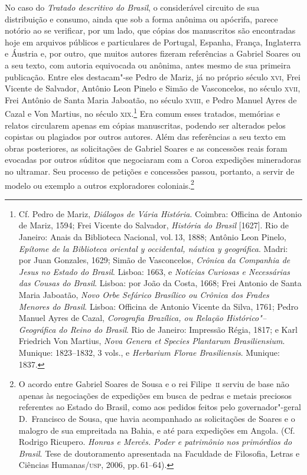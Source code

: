 \documentclass[12pt]{extarticle}
\begin{document}
No caso do \textit{Tratado descritivo do Brasil}, o considerável
circuito de sua distribuição e consumo, ainda que sob a forma anônima
ou apócrifa, parece notório ao se verificar, por um lado, que cópias
dos manuscritos são encontradas hoje em arquivos públicos e
particulares de Portugal, Espanha, França, Inglaterra e Áustria e, por
outro, que muitos autores fizeram referências a Gabriel Soares ou a seu
texto, com autoria equivocada ou anônima, antes mesmo de sua primeira
publicação. Entre eles destacam"-se Pedro de Mariz, já no próprio século
\textsc{xvi}, Frei Vicente de Salvador, Antônio Leon Pinelo e Simão de
Vasconcelos, no século \textsc{xvii}, Frei Antônio de Santa Maria Jaboatão, no
século \textsc{xviii}, e Pedro Manuel Ayres de Cazal e Von Martius, no século
\textsc{xix}.\footnote{ Cf. Pedro de Mariz, \textit{Diálogos de Vária História}.
Coimbra: Officina de Antonio de Mariz, 1594; Frei Vicente do
Salvador,\textit{ História do Brasil} [1627]. Rio de Janeiro: Anais da
Biblioteca Nacional, vol.\,13, 1888; Antônio Leon Pinelo, \textit{Epítome
de la Biblioteca oriental y occidental, náutica y geográfica}. Madri:
por Juan Gonzales, 1629;  Simão de Vasconcelos, \textit{Crônica
da Companhia de Jesus no Estado do Brasil}. Lisboa: 1663, e
\textit{Notícias Curiosas e Necessárias das Cousas do Brasil}. Lisboa:
por João da Costa, 1668; Frei Antonio de Santa Maria Jaboatão,
\textit{Novo Orbe Sefárico Brasílico ou Crônica dos Frades Menores do
Brasil}. Lisboa: Officina de Antonio Vicente da Silva, 1761; 
Pedro Manuel Ayres de Cazal, \textit{Corografia Brazílica, ou Relação
Histórico"--Geográfica do Reino do Brasil}. Rio de Janeiro: Impressão
Régia, 1817; e Karl Friedrich Von Martius,
\textit{Nova Genera et Species Plantarum
Brasiliensium}. Munique: 1823--1832, 3 vols., e \textit{Herbarium
Florae Brasiliensis}. Munique: 1837.} Era comum esses tratados,
memórias e relatos circularem apenas em cópias manuscritas, podendo ser
alterados pelos copistas ou plagiados por outros autores. Além das
referências a seu texto em obras posteriores, as solicitações de
Gabriel Soares e as concessões reais foram evocadas por outros súditos
que negociaram com a Coroa expedições mineradoras no ultramar. Seu
processo de petições e concessões passou, portanto, a servir de modelo
ou exemplo a outros exploradores coloniais.\footnote{ O acordo entre
Gabriel Soares de Sousa e o rei Filipe~\textsc{ii} serviu de base não apenas
às negociações de expedições em busca de pedras e metais preciosos
referentes ao Estado do Brasil, como aos pedidos feitos pelo 
governador"-geral D.~Francisco de Sousa, que havia acompanhado as
solicitações de Soares e o malogro de sua empreitada na Bahia, e até
para expedições em Angola. (Cf. Rodrigo Ricupero. \textit{Honras e Mercês.
Poder e patrimônio nos primórdios do Brasil}. Tese de doutoramento apresentada
na Faculdade de Filosofia, Letras e Ciências Humanas/\textsc{usp}, 2006, pp.\,61--64).}
\end{document}

